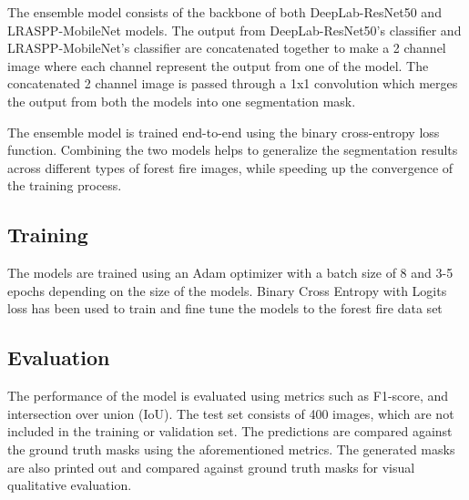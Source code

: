 The ensemble model consists of the backbone of both DeepLab-ResNet50 \cite{chen_rethinking_2017} and LRASPP-MobileNet \cite{howard2019searching} models. The output from DeepLab-ResNet50's classifier and LRASPP-MobileNet's classifier are concatenated together to make a 2 channel image where each channel represent the output from one of the model. The concatenated 2 channel image is passed through a 1x1 convolution which merges the output from both the models into one segmentation mask.

The ensemble model is trained end-to-end using the binary cross-entropy loss function. Combining the two models helps to generalize the segmentation results across different types of forest fire images, while speeding up the convergence of the training process.

\subsection{Training}

The models are trained using an Adam optimizer with a batch size of 8 and 3-5 epochs depending on the size of the models. Binary Cross Entropy with Logits loss has been used to train and fine tune the models to the forest fire data set

\subsection{Evaluation}

The performance of the model is evaluated using metrics such as F1-score, and intersection over union (IoU). The test set consists of 400 images, which are not included in the training or validation set. The predictions are compared against the ground truth masks using the aforementioned metrics. The generated masks are also printed out and compared against ground truth masks for visual qualitative evaluation.